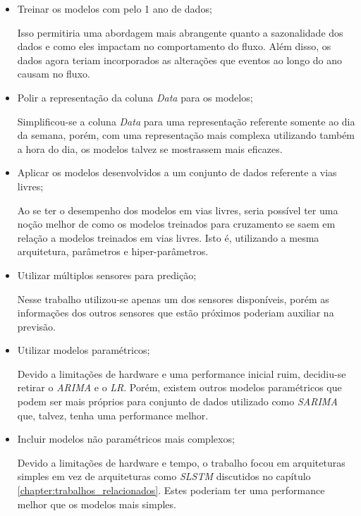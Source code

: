 \begin{itemize}
    \item Treinar os modelos com pelo 1 ano de dados;
    
    Isso permitiria uma abordagem mais abrangente quanto a sazonalidade dos dados e como eles impactam no comportamento do fluxo. Além disso, os dados agora teriam incorporados as alterações que eventos ao longo do ano causam no fluxo.
    
    \item Polir a representação da coluna  \textit{Data} para os modelos;
    
    Simplificou-se a coluna \textit{Data} para uma representação referente somente ao dia da semana, porém, com uma representação mais complexa utilizando também a hora do dia, os modelos talvez se mostrassem mais eficazes.

    \item Aplicar os modelos desenvolvidos a um conjunto de dados referente a vias livres;
    
    Ao se ter o desempenho dos modelos em vias livres, seria possível ter uma noção melhor de como os modelos treinados para cruzamento se saem em relação a modelos treinados em vias livres. Isto é, utilizando a mesma arquitetura, parâmetros e hiper-parâmetros.
    
    \item Utilizar múltiplos sensores para predição;
    
    Nesse trabalho utilizou-se apenas um dos sensores disponíveis, porém as informações dos outros sensores que estão próximos poderiam auxiliar na previsão.
    
    \item Utilizar modelos paramétricos;
    
    Devido a limitações de hardware e uma performance inicial ruim, decidiu-se retirar o \textit{\acrfull{ARIMA}} e o \textit{\acrfull{LR}}. Porém, existem outros modelos paramétricos que podem ser mais próprios para conjunto de dados utilizado como \textit{\acrfull{SARIMA}} que, talvez, tenha uma performance melhor.
    
    \item Incluir modelos não paramétricos mais complexos;
    
    Devido a limitações de hardware e tempo, o trabalho focou em arquiteturas simples em vez de arquiteturas como \textit{\acrshort{SLSTM}} discutidos no capítulo \ref{chapter:trabalhos_relacionados}. Estes poderiam ter uma performance melhor que os modelos mais simples.
    

\end{itemize}
